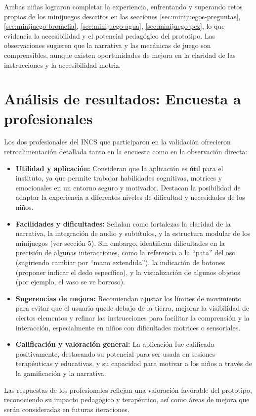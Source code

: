 Ambas niñas lograron completar la experiencia, enfrentando y superando retos propios de los minijuegos descritos en las secciones \ref{sec:minijuegos-preguntas}, \ref{sec:minijuego-bromelia}, \ref{sec:minijuego-agua}, \ref{sec:minijuego-pez}, lo que evidencia la accesibilidad y el potencial pedagógico del prototipo. Las observaciones sugieren que la narrativa y las mecánicas de juego son comprensibles, aunque existen oportunidades de mejora en la claridad de las instrucciones y la accesibilidad motriz.

\section{Análisis de resultados: Encuesta a profesionales}

Los dos profesionales del INCS que participaron en la validación ofrecieron retroalimentación detallada tanto en la encuesta como en la observación directa:

\begin{itemize}
    \item \textbf{Utilidad y aplicación:} Consideran que la aplicación es útil para el instituto, ya que permite trabajar habilidades cognitivas, motrices y emocionales en un entorno seguro y motivador. Destacan la posibilidad de adaptar la experiencia a diferentes niveles de dificultad y necesidades de los niños.
    \item \textbf{Facilidades y dificultades:} Señalan como fortalezas la claridad de la narrativa, la integración de audio y subtítulos, y la estructura modular de los minijuegos (ver sección 5). Sin embargo, identifican dificultades en la precisión de algunas interacciones, como la referencia a la ``pata'' del oso (sugiriendo cambiar por ``mano extendida''), la indicación de botones (proponer indicar el dedo específico), y la visualización de algunos objetos (por ejemplo, el vaso se ve borroso).
    \item \textbf{Sugerencias de mejora:} Recomiendan ajustar los límites de movimiento para evitar que el usuario quede debajo de la tierra, mejorar la visibilidad de ciertos elementos y refinar las instrucciones para facilitar la comprensión y la interacción, especialmente en niños con dificultades motrices o sensoriales.
    \item \textbf{Calificación y valoración general:} La aplicación fue calificada positivamente, destacando su potencial para ser usada en sesiones terapéuticas y educativas, y su capacidad para motivar a los niños a través de la gamificación y la narrativa.
\end{itemize}

Las respuestas de los profesionales reflejan una valoración favorable del prototipo, reconociendo su impacto pedagógico y terapéutico, así como áreas de mejora que serán consideradas en futuras iteraciones.

